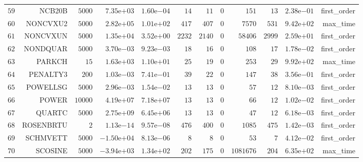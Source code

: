 \begin{longtable}{rrrrrrrrrrrr}
  \(    59\) & NCB20B & \(  5000\) & \( 7.35\)e\(+03\) & \( 1.60\)e\(-04\) & \(    14\) & \(    11\) & \(     0\) & \(   151\) & \(    13\) & \( 2.38\)e\(-01\) & first\_order \\
  \(    60\) & NONCVXU2 & \(  5000\) & \( 2.82\)e\(+05\) & \( 1.01\)e\(+02\) & \(   417\) & \(   407\) & \(     0\) & \(  7570\) & \(   531\) & \( 9.42\)e\(+02\) & max\_time \\
  \(    61\) & NONCVXUN & \(  5000\) & \( 1.35\)e\(+04\) & \( 3.52\)e\(+00\) & \(  2232\) & \(  2140\) & \(     0\) & \( 58406\) & \(  2999\) & \( 2.59\)e\(+01\) & first\_order \\
  \(    62\) & NONDQUAR & \(  5000\) & \( 3.70\)e\(-03\) & \( 9.23\)e\(-03\) & \(    18\) & \(    16\) & \(     0\) & \(   108\) & \(    17\) & \( 1.78\)e\(-02\) & first\_order \\
  \(    63\) & PARKCH & \(    15\) & \( 1.63\)e\(+03\) & \( 1.10\)e\(+01\) & \(    25\) & \(    19\) & \(     0\) & \(   253\) & \(    29\) & \( 9.92\)e\(+02\) & max\_time \\
  \(    64\) & PENALTY3 & \(   200\) & \( 1.03\)e\(-03\) & \( 7.41\)e\(-01\) & \(    39\) & \(    22\) & \(     0\) & \(   147\) & \(    38\) & \( 3.56\)e\(-01\) & first\_order \\
  \(    65\) & POWELLSG & \(  5000\) & \( 2.96\)e\(-03\) & \( 1.54\)e\(-02\) & \(    13\) & \(    13\) & \(     0\) & \(    57\) & \(    12\) & \( 8.10\)e\(-03\) & first\_order \\
  \(    66\) & POWER & \( 10000\) & \( 4.19\)e\(+07\) & \( 7.18\)e\(+07\) & \(    13\) & \(    13\) & \(     0\) & \(    66\) & \(    12\) & \( 1.02\)e\(-02\) & first\_order \\
  \(    67\) & QUARTC & \(  5000\) & \( 2.75\)e\(+09\) & \( 6.45\)e\(+06\) & \(    13\) & \(    13\) & \(     0\) & \(    47\) & \(    12\) & \( 6.18\)e\(-03\) & first\_order \\
  \(    68\) & ROSENBRTU & \(     2\) & \( 1.13\)e\(-14\) & \( 9.57\)e\(-08\) & \(   476\) & \(   400\) & \(     0\) & \(  1085\) & \(   475\) & \( 1.42\)e\(-03\) & first\_order \\
  \(    69\) & SCHMVETT & \(  5000\) & \(-1.50\)e\(+04\) & \( 8.13\)e\(-06\) & \(     8\) & \(     8\) & \(     0\) & \(    53\) & \(     7\) & \( 4.12\)e\(-02\) & first\_order \\
  \(    70\) & SCOSINE & \(  5000\) & \(-3.94\)e\(+03\) & \( 1.34\)e\(+02\) & \(   202\) & \(   175\) & \(     0\) & \(1081676\) & \(   204\) & \( 6.35\)e\(+02\) & max\_time \\

\end{longtable}
